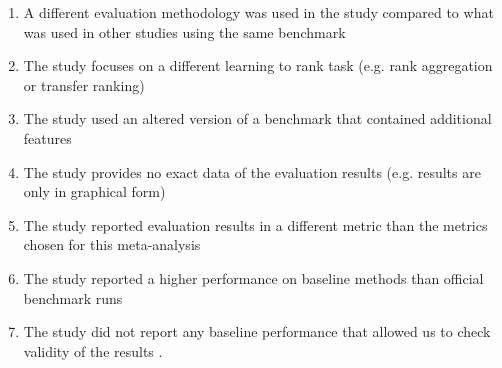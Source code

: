 \documentclass{llncs}
\begin{document}
\begin{enumerate}
\item A different evaluation methodology was used in the study compared to what was used in other studies using the same benchmark \cite{Geng2011,Lin2012}
\item The study focuses on a different learning to rank task (e.g. rank aggregation or transfer ranking) \cite{De2011,De2010,Derhami2013,De2012,Chen2010,Ah-Pine2008,Wang2009c,De2013,Miao2013,Hoi2008,De2012b,Duh2011b,Argentini2012,Qin2010c,Volkovs2013,Desarkar2011,Pan2013,Lin2011b,Volkovs2012,Dammak2011}
\item The study used an altered version of a benchmark that contained additional features \cite{Bidoki2009,Ding2010}
\item The study provides no exact data of the evaluation results (e.g. results are only in graphical form) \cite{Wang2008,Wang2010,Xu2010,Kuo2009,Li2008,Xia2008,Zhou2011,Wu2011,Zhu2009,Karimzadehgan2011,Swersky2012,Pan2011,Ni2008,Ciaramita2008,Stewart2012,Petterson2009,Agarwal2010,Chang2009,Qin2008c,Adams2011,Sculley2009,Huang2008,Alejo2010,Sun2011,He2010b,Benbouzid2012,Geng2012,Chen2012,Xu2012,Shivaswamy2011}
\item The study reported evaluation results in a different metric than the metrics chosen for this meta-analysis \cite{Yu2009,Thuy2009,Pahikkala2009,Kersting2009,Mohan2011}
\item The study reported a higher performance on baseline methods than official benchmark runs \cite{Dubey2009,Banerjee2009,Peng2010b,Song2014,Bian2010,Bian2010b,Carvalho2008,Acharyya2012,Peng2010b,Tran2012,Asadi2013c}
\item The study did not report any baseline performance that allowed us to check validity of the results \cite{Chakrabarti2008,Wang2012b,Buffoni2011}.
\end{enumerate}
\vspace{-0.08in}
\end{document}
